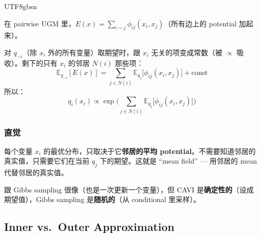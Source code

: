 \documentclass[11pt]{article}
\begin{document}
\begin{CJK}{UTF8}{gbsn}
\vspace{0.3em}
\noindent{}
\vspace{0.3em}

在 pairwise UGM 里，$E(x) = \sum_{i \sim j} \phi_{ij}(x_i, x_j)$（所有边上的 potential 加起来）。

对 $q_{-i}$（除 $x_i$ 外的所有变量）取期望时，跟 $x_i$ 无关的项变成常数（被 $\propto$ 吸收）。剩下的只有 $x_i$ 的邻居 $N(i)$ 那些项：
\[
  \mathbb{E}_{q_{-i}}[E(x)] = \sum_{j \in N(i)} \mathbb{E}_{q_j}\!\big[\phi_{ij}(x_i, x_j)\big] + \text{const}
\]
所以：
\[
  \boxed{q_i(x_i) \propto \exp\!\bigg(\sum_{j \in N(i)} \mathbb{E}_{q_j}\!\big[\phi_{ij}(x_i, x_j)\big]\bigg)}
\]

\subsubsection{直觉}

每个变量 $x_i$ 的最优分布，只取决于它\textbf{邻居的平均 potential}。不需要知道邻居的真实值，只需要它们在当前 $q_j$ 下的期望。这就是 ``mean field'' --- 用邻居的 mean 代替邻居的真实值。

跟 Gibbs sampling 很像（也是一次更新一个变量），但 CAVI 是\textbf{确定性的}（设成期望值），Gibbs sampling 是\textbf{随机的}（从 conditional 里采样）。

\subsection{Inner vs.\ Outer Approximation}


\end{CJK}
\end{document}

